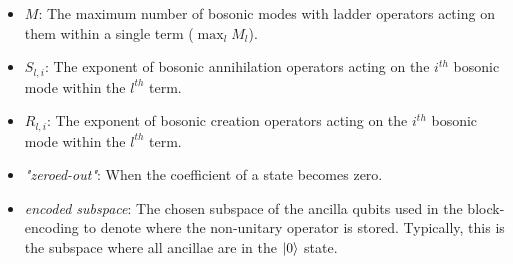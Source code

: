\begin{itemize}
    \item $M$: The maximum number of bosonic modes with ladder operators acting on them within a single term ($\max_l M_l$).
    \item $S_{l, i}$: The exponent of bosonic annihilation operators acting on the $i^{th}$ bosonic mode within the $l^{th}$ term.
    \item $R_{l, i}$: The exponent of bosonic creation operators acting on the $i^{th}$ bosonic mode within the $l^{th}$ term.
    \item \textit{"zeroed-out"}: When the coefficient of a state becomes zero.
    \item \textit{encoded subspace}: The chosen subspace of the ancilla qubits used in the block-encoding to denote where the non-unitary operator is stored. Typically, this is the subspace where all ancillae are in the $\ket{0}$ state.
\end{itemize}